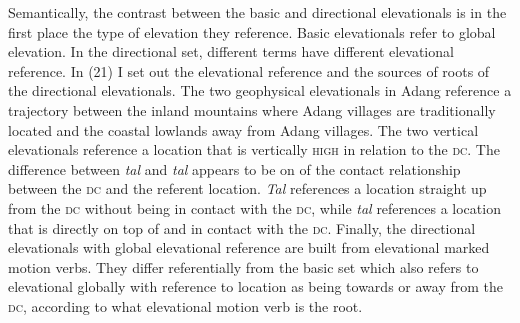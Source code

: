 Semantically, the contrast between the basic and directional elevationals is in the first place the type of elevation they reference. Basic elevationals refer to global elevation. In the directional set, different terms have different elevational reference. In (21) I set out the elevational reference and the sources of roots of the directional elevationals. The two geophysical elevationals in Adang reference a trajectory between the inland mountains where Adang villages are traditionally located and the coastal lowlands away from Adang villages. The two vertical elevationals reference a location that is vertically \textsc{high} in relation to the \textsc{dc}. The difference between \textit{ta}\textit{{\textglotstop}}\textit{l}\textit{{\textepsilon}} and \textit{tal}\textit{{\textepsilon}} appears to be on of the contact relationship between the \textsc{dc }and the referent location. \textit{Ta}\textit{{\textglotstop}}\textit{l}\textit{{\textepsilon}} references a location straight up from the \textsc{dc} 
without being in contact with the \textsc{dc}, while \textit{tal}\textit{{\textepsilon} }references a location that is directly on top of and in contact with the \textsc{dc. F}inally, the directional elevationals with global elevational reference are built from elevational marked motion verbs. They differ referentially from the basic set which also refers to elevational globally with reference to location as being towards or away from the \textsc{dc}, according to what elevational motion verb is the root.  

